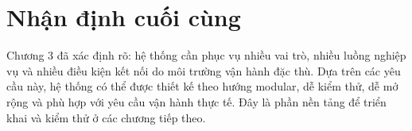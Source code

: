 \section{Nhận định cuối cùng}

Chương 3 đã xác định rõ: hệ thống cần phục vụ nhiều vai trò, nhiều luồng nghiệp vụ và nhiều điều kiện kết nối do môi trường vận hành đặc thù. Dựa trên các yêu cầu này, hệ thống có thể được thiết kế theo hướng modular, dễ kiểm thử, dễ mở rộng và phù hợp với yêu cầu vận hành thực tế. Đây là phần nền tảng để triển khai và kiểm thử ở các chương tiếp theo.

